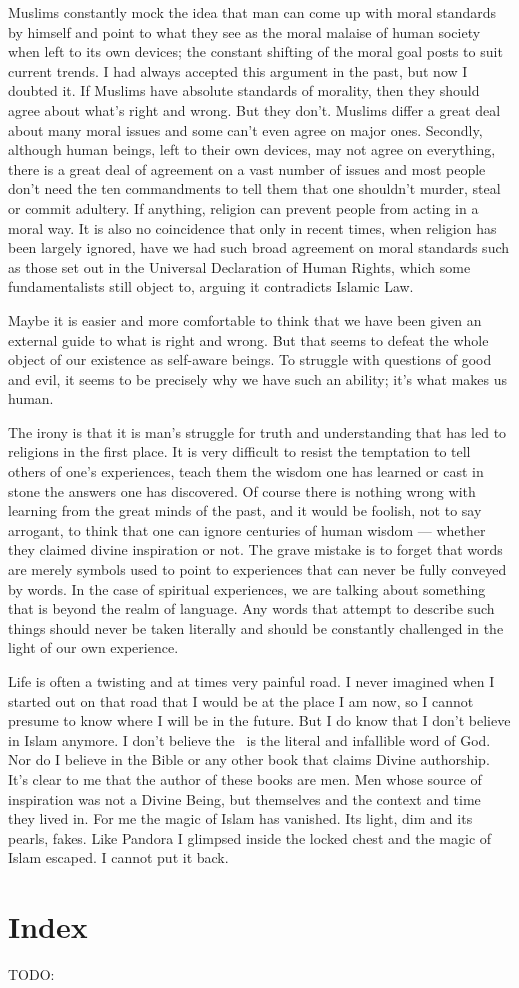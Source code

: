 \documentclass[12pt]{memoir}
\begin{document}
Muslims constantly mock the idea that man can come up with moral standards
by himself and point to what they see as the moral malaise
of human society when left to its own devices;
the constant shifting of the moral goal posts to suit current trends.
I had always accepted this argument in the past, but now I doubted it.
If Muslims have absolute standards of morality,
then they should agree about what’s right and wrong.
But they don’t.
Muslims differ a great deal about many moral issues
and some can’t even agree on major ones.
Secondly, although human beings, left to their own devices,
may not agree on everything,
there is a great deal of agreement on a vast number of issues
and most people don’t need the ten commandments to tell them
that one shouldn’t murder, steal or commit adultery.
If anything, religion can prevent people from acting in a moral way.
It is also no coincidence that only in recent times,
when religion has been largely ignored, have we had such broad agreement
on moral standards such as those set out
in the Universal Declaration of Human Rights,
which some fundamentalists still object to,
arguing it contradicts Islamic Law.

Maybe it is easier and more comfortable to think
that we have been given an external guide to what is right and wrong.
But that seems to defeat the whole object
of our existence as self-aware beings.
To struggle with questions of good and evil,
it seems to be precisely why we have such an ability;
it’s what makes us human.

The irony is that it is man’s struggle for truth
and understanding that has led to religions in the first place.
It is very difficult to resist the temptation
to tell others of one’s experiences,
teach them the wisdom one has learned
or cast in stone the answers one has discovered.
Of course there is nothing wrong with learning
from the great minds of the past, and it would be foolish,
not to say arrogant, to think that one can ignore centuries of human wisdom —
whether they claimed divine inspiration or not.
The grave mistake is to forget that words are merely symbols
used to point to experiences that can never be fully conveyed by words.
In the case of spiritual experiences, we are talking about something
that is beyond the realm of language.
Any words that attempt to describe such things should never be taken literally
and should be constantly challenged in the light of our own experience.

Life is often a twisting and at times very painful road.
I never imagined when I started out on that road
that I would be at the place I am now,
so I cannot presume to know where I will be in the future.
But I do know that I don’t believe in Islam anymore.
I don’t believe the \Quran\ is the literal and infallible word of God.
Nor do I believe in the Bible or any other book that claims Divine authorship.
It’s clear to me that the author of these books are men.
Men whose source of inspiration was not a Divine Being,
but themselves and the context and time they lived in.
For me the magic of Islam has vanished.
Its light, dim and its pearls, fakes.
Like Pandora I glimpsed inside the locked chest
and the magic of Islam escaped.
I cannot put it back.


\backmatter

\chapter{Index}
TODO:
\end{document}

